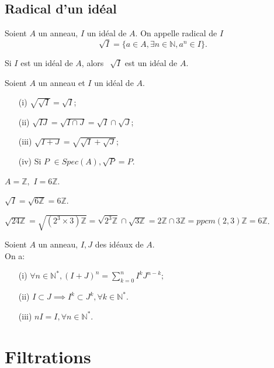 \subsection{Radical d'un idéal}
\begin{madefinition}
	Soient $A$ un anneau, $I$ un idéal de $A$. On appelle radical de $I$
	\[\sqrt[]{I} = \{ a \in A, \exists  n \in \mathbb{N}, a^n \in I \}. \]
\end{madefinition}
\begin{maremarque}
	Si $I$ est un idéal de $A$, alors $\, \sqrt[]{I}$ est un idéal de $A$.
\end{maremarque}
\begin{maproposition}
	Soient $A$ un anneau et $I$ un idéal de $A$.
	\begin{enumerate}
		\item[(i)] $\sqrt{\sqrt{I}} = \sqrt{I}$;
		\item[(ii)] $\sqrt{IJ} = \sqrt{I\cap J}=\sqrt{I}\cap \sqrt{J}$;
		\item[(iii)] $\sqrt{I+J} = \sqrt{\sqrt{I}+\sqrt{J}}$;
		\item[(iv)] Si $P$ $\in Spec(A),\sqrt{P}=P$.
	\end{enumerate}
\end{maproposition}
\begin{monexemple}
	$A=\mathbb{Z},$ $I=6\mathbb{Z}$.
	
	$\sqrt{I}=\sqrt{6\mathbb{Z}}=6\mathbb{Z}$.
	
	$\sqrt{24\mathbb{Z}}=\sqrt{(2^{3}\times 3)\mathbb{Z}}=\sqrt{2^{3}\mathbb{Z}}\cap \sqrt{3\mathbb{Z}}=2\mathbb{Z}\cap 3\mathbb{Z}=ppcm(2,3)\mathbb{Z}=6\mathbb{Z}$.
\end{monexemple}
\begin{maproposition}
	Soient $A$ un anneau, $I,J$ des idéaux de $A$. \\
	On a:
	\begin{enumerate}
		\item[(i)] $\forall n \in \mathbb{N}^{*}, (I+J)^n =\displaystyle \sum_{k=0}^{n} I^k J^{n-k};$
		\item[(ii)] $I \subset J \implies I^k \subset J^k , \forall k \in \mathbb{N}^*.$
		\item [(iii)] $nI=I, \forall n \in \mathbb{N}^*.$
	\end{enumerate}
\end{maproposition}
\section{Filtrations}
